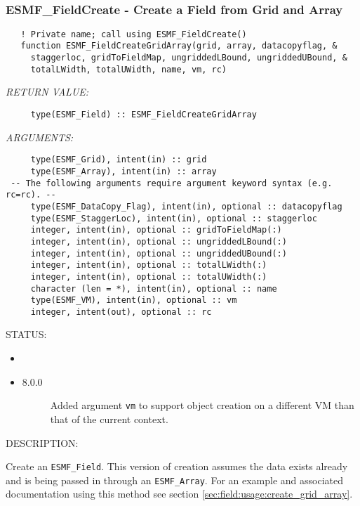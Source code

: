 \mbox{}\hrulefill\ 
 
\subsubsection [ESMF\_FieldCreate] {ESMF\_FieldCreate - Create a Field from Grid and Array}


\begin{verbatim}   ! Private name; call using ESMF_FieldCreate()
   function ESMF_FieldCreateGridArray(grid, array, datacopyflag, &
     staggerloc, gridToFieldMap, ungriddedLBound, ungriddedUBound, &
     totalLWidth, totalUWidth, name, vm, rc)\end{verbatim}{\em RETURN VALUE:}
\begin{verbatim}     type(ESMF_Field) :: ESMF_FieldCreateGridArray\end{verbatim}{\em ARGUMENTS:}
\begin{verbatim}     type(ESMF_Grid), intent(in) :: grid
     type(ESMF_Array), intent(in) :: array
 -- The following arguments require argument keyword syntax (e.g. rc=rc). --
     type(ESMF_DataCopy_Flag), intent(in), optional :: datacopyflag
     type(ESMF_StaggerLoc), intent(in), optional :: staggerloc
     integer, intent(in), optional :: gridToFieldMap(:)
     integer, intent(in), optional :: ungriddedLBound(:)
     integer, intent(in), optional :: ungriddedUBound(:)
     integer, intent(in), optional :: totalLWidth(:)
     integer, intent(in), optional :: totalUWidth(:)
     character (len = *), intent(in), optional :: name
     type(ESMF_VM), intent(in), optional :: vm
     integer, intent(out), optional :: rc\end{verbatim}
{\sf STATUS:}
   \begin{itemize}
   \item{}
   \item{}
   \begin{description}
   \item[8.0.0] Added argument {\tt vm} to support object creation on a
   different VM than that of the current context.
   \end{description}
   \end{itemize}
  
{\sf DESCRIPTION:\\ }


   Create an {\tt ESMF\_Field}. This version of creation
   assumes the data exists already and is being
   passed in through an {\tt ESMF\_Array}. For an example and
   associated documentation using this method see section
   \ref{sec:field:usage:create_grid_array}.
  
